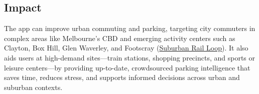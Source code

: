 \subsection{Impact}

The app can improve urban commuting and parking, targeting city commuters in complex areas like Melbourne’s CBD and emerging activity centers such as Clayton, Box Hill, Glen Waverley, and Footscray (\href{https://bigbuild.vic.gov.au/projects/suburban-rail-loop/about}{Suburban Rail Loop}). It also aids users at high-demand sites—train stations, shopping precincts, and sports or leisure centers—by providing up-to-date, crowdsourced parking intelligence that saves time, reduces stress, and supports informed decisions across urban and suburban contexts.

